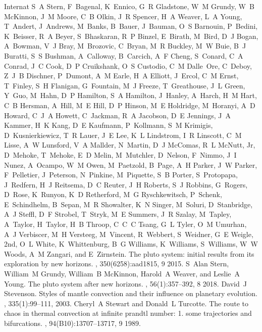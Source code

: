 \documentclass[letterpaper,10pt,english]{jupyterBook}
\begin{document}
\begin{sphinxthebibliography}{Internat}
S A Stern, F Bagenal, K Ennico, G R Gladstone, W M Grundy, W B McKinnon, J M Moore, C B Olkin, J R Spencer, H A Weaver, L A Young, T Andert, J Andrews, M Banks, B Bauer, J Bauman, O S Barnouin, P Bedini, K Beisser, R A Beyer, S Bhaskaran, R P Binzel, E Birath, M Bird, D J Bogan, A Bowman, V J Bray, M Brozovic, C Bryan, M R Buckley, M W Buie, B J Buratti, S S Bushman, A Calloway, B Carcich, A F Cheng, S Conard, C A Conrad, J C Cook, D P Cruikshank, O S Custodio, C M Dalle Ore, C Deboy, Z J B Dischner, P Dumont, A M Earle, H A Elliott, J Ercol, C M Ernst, T Finley, S H Flanigan, G Fountain, M J Freeze, T Greathouse, J L Green, Y Guo, M Hahn, D P Hamilton, S A Hamilton, J Hanley, A Harch, H M Hart, C B Hersman, A Hill, M E Hill, D P Hinson, M E Holdridge, M Horanyi, A D Howard, C J A Howett, C Jackman, R A Jacobson, D E Jennings, J A Kammer, H K Kang, D E Kaufmann, P Kollmann, S M Krimigis, D Kusnierkiewicz, T R Lauer, J E Lee, K L Lindstrom, I R Linscott, C M Lisse, A W Lunsford, V A Mallder, N Martin, D J McComas, R L McNutt, Jr, D Mehoke, T Mehoke, E D Melin, M Mutchler, D Nelson, F Nimmo, J I Nunez, A Ocampo, W M Owen, M Paetzold, B Page, A H Parker, J W Parker, F Pelletier, J Peterson, N Pinkine, M Piquette, S B Porter, S Protopapa, J Redfern, H J Reitsema, D C Reuter, J H Roberts, S J Robbins, G Rogers, D Rose, K Runyon, K D Retherford, M G Ryschkewitsch, P Schenk, E Schindhelm, B Sepan, M R Showalter, K N Singer, M Soluri, D Stanbridge, A J Steffl, D F Strobel, T Stryk, M E Summers, J R Szalay, M Tapley, A Taylor, H Taylor, H B Throop, C C C Tsang, G L Tyler, O M Umurhan, A J Verbiscer, M H Versteeg, M Vincent, R Webbert, S Weidner, G E Weigle, 2nd, O L White, K Whittenburg, B G Williams, K Williams, S Williams, W W Woods, A M Zangari, and E Zirnstein. The pluto system: initial results from its exploration by new horizons. , 350(6258):aad1815, 9 2015.
\sphinxAtStartPar
S Alan Stern, William M Grundy, William B McKinnon, Harold A Weaver, and Leslie A Young. The pluto system after new horizons. , 56(1):357–392, 8 2018.
\sphinxAtStartPar
David J Stevenson. Styles of mantle convection and their influence on planetary evolution. , 335(1):99–111, 2003.
\sphinxAtStartPar
Cheryl A Stewart and Donald L Turcotte. The route to chaos in thermal convection at infinite prandtl number: 1. some trajectories and bifurcations. , 94(B10):13707–13717, 9 1989.

\end{sphinxthebibliography}
\end{document}
